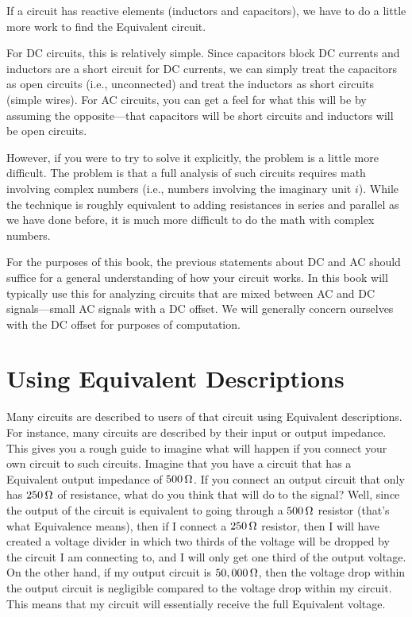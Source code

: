 If a circuit has reactive elements (inductors and capacitors), we have to do a little more work to find the \thev Equivalent circuit.

For DC circuits, this is relatively simple. 
Since capacitors block DC currents and inductors are a short circuit for DC currents, we can simply treat the capacitors as open circuits (i.e., unconnected) and treat the inductors as short circuits (simple wires).
For AC circuits, you can get a feel for what this will be by assuming the opposite---that capacitors will be short circuits and inductors will be open circuits.

However, if you were to try to solve it explicitly, the problem is a little more difficult.
The problem is that a full analysis of such circuits requires math involving complex numbers (i.e., numbers involving the imaginary unit $i$).  
While the technique is roughly equivalent to adding resistances in series and parallel as we have done before, it is much more difficult to do the math with complex numbers.

For the purposes of this book, the previous statements about DC and AC should suffice for a general understanding of how your circuit works.
In this book will typically use this for analyzing circuits that are mixed between AC and DC signals---small AC signals with a DC offset.
We will generally concern ourselves with the DC offset for purposes of computation.

\section{Using \thev Equivalent Descriptions}

Many circuits are described to users of that circuit using \thev Equivalent descriptions.
For instance, many circuits are described by their input or output impedance.
This gives you a rough guide to imagine what will happen if you connect your own circuit to such circuits.
Imagine that you have a circuit that has a \thev Equivalent output impedance of $500\,\si{\ohm}$.
If you connect an output circuit that only has $250\,\si{\ohm}$ of resistance, what do you think that will do to the signal?
Well, since the output of the circuit is equivalent to going through a $500\,\si{\ohm}$ resistor (that's what \thev Equivalence means), then if I connect a $250\,\si{\ohm}$ resistor, then I will have created a voltage divider in which two thirds of the voltage will be dropped by the circuit I am connecting to, and I will only get one third of the output voltage.
On the other hand, if my output circuit is $50,000\,\si{\ohm}$, then the voltage drop within the output circuit is negligible compared to the voltage drop within my circuit.
This means that my circuit will essentially receive the full \thev Equivalent voltage.

